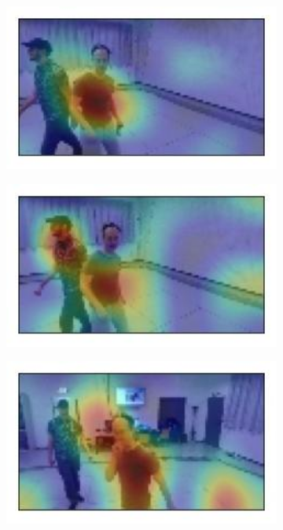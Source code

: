 \begin{figure}[!h]
	\begin{center}
		\begin{subfigure}[h]{0.24\textwidth}
			\centering
			\includegraphics[width=1\textwidth]{"contents/images/gradcam/gradcam-double-1"}
		\end{subfigure}
		\hfill
		\begin{subfigure}[h]{0.24\textwidth}
			\centering
			\includegraphics[width=1\textwidth]{"contents/images/gradcam/gradcam-double-2"}
		\end{subfigure}
		\hfill
		\begin{subfigure}[h]{0.24\textwidth}
			\centering
			\includegraphics[width=1\textwidth]{"contents/images/gradcam/gradcam-double-3"}

\end{subfigure}
\end{center}
\end{figure}
